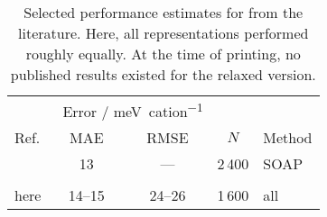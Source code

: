 \begin{table}
  
    \caption{
      Selected performance estimates for \dstcou from the literature.
      Here, all representations performed roughly equally.
      At the time of printing, no published results existed for the relaxed \dstcor{} version.
    }

    \begin{tabular}{@{}lcccl@{}}
        \toprule
             & \multicolumn{2}{c}{\ Error / \unit{\milli\eV\per cation}} \\ \cmidrule(lr){2-3}
        Ref. & MAE & RMSE & $N$ & Method \\
        \midrule
        \cite{sgzs2019q} & 13 & --- & 2\,400 & SOAP \\
        \\
        here                        & 14--15 & 24--26 & 1\,600 & all \\
        \bottomrule
      \end{tabular}
    \label{tab:si-repsbench_lit_nmd18}
\end{table}
